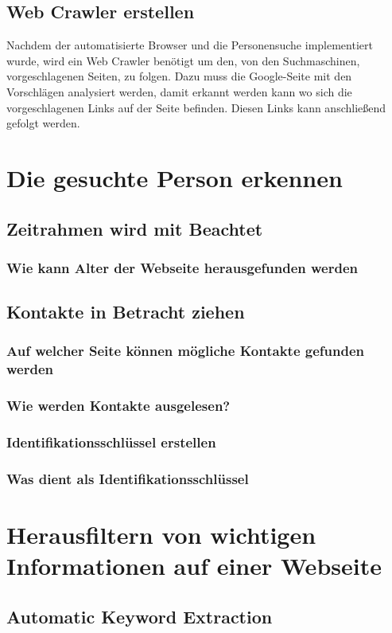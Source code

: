 	\subsection{Web Crawler erstellen}
	Nachdem der automatisierte Browser und die Personensuche implementiert wurde, wird ein Web Crawler benötigt um den, von den Suchmaschinen, vorgeschlagenen Seiten, zu folgen. Dazu muss die Google-Seite mit den Vorschlägen analysiert werden, damit erkannt werden kann wo sich die vorgeschlagenen Links auf der Seite befinden. Diesen Links kann anschließend gefolgt werden.
	
\section{Die gesuchte Person erkennen}
	\subsection{Zeitrahmen wird mit Beachtet}
		\subsubsection{Wie kann Alter der Webseite herausgefunden werden}
	\subsection{Kontakte in Betracht ziehen}
		\subsubsection{Auf welcher Seite können mögliche Kontakte gefunden werden}
		\subsubsection{Wie werden Kontakte ausgelesen?}
	\subsubsection{Identifikationsschlüssel erstellen}
		\subsubsection{Was dient als Identifikationsschlüssel}
		
\section{Herausfiltern von wichtigen Informationen auf einer Webseite}
	\subsection{Automatic Keyword Extraction}%
